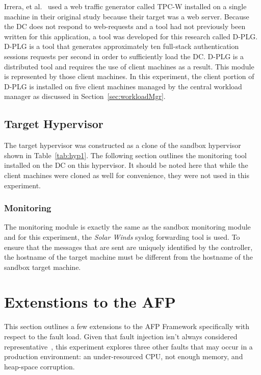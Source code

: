 Irrera, et al.~\cite{irrera2015} used a web traffic generator called TPC-W
installed on a single machine in their original study because their target was
a web server.  Because the \ac{DC} does not respond to web-requests and a tool
had not previously been written for this application, a tool was developed for
this research called \ac{D-PLG}. \ac{D-PLG} is a tool that generates
approximately ten full-stack authentication sessions requests per second in
order to sufficiently load the \ac{DC}.  \ac{D-PLG} is a distributed tool and
requires the use of client machines as a result.  This module is represented by
those client machines.  In this experiment, the client portion of \ac{D-PLG} is
installed on five client machines managed by the central workload manager as
discussed in Section~\ref{sec:workloadMgr}.

\subsection{Target Hypervisor} \label{sec:target}
The target hypervisor was constructed as a clone of the sandbox hypervisor
shown in Table~\ref{tab:hyp1}.  The following section outlines the monitoring
tool installed on the \ac{DC} on this hypervisor.  It should be noted here that
while the client machines were cloned as well for convenience, they were not
used in this experiment.

\subsubsection{Monitoring} \label{sec:targetMonitoringTool}
The monitoring module is exactly the same as the sandbox monitoring module and
for this experiment, the \emph{Solar Winds} syslog forwarding tool is used.  To
ensure that the messages that are sent are uniquely identified by the
controller, the hostname of the target machine must be different from the
hostname of the sandbox target machine.

\setcounter{secnumdepth}{3}

\section{Extenstions to the \ac{AFP}} \label{sec:extensions}
This section outlines a few extensions to the \ac{AFP} Framework specifically
with respect to the fault load.  Given that fault injection isn't always
considered representative~\cite{kikuchi2014}, this experiment explores three
other faults that may occur in a production environment:  an under-resourced
\ac{CPU}, not enough memory, and heap-space corruption.

